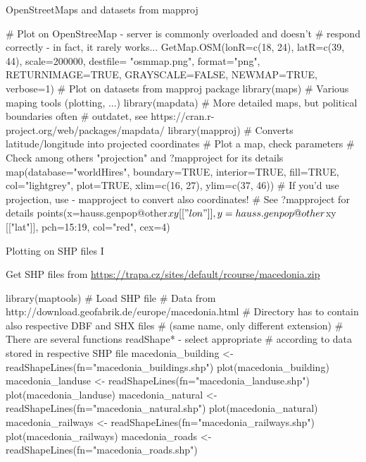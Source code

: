 \documentclass[compress, ucs, xelatex, 11pt, xcolor=svgnames,
  hyperref={
    bookmarks=true,
    unicode=true,
    colorlinks=true,
    pdftitle={Molecular data in R},
    plainpages=false,
    pdfauthor={Vojtech Zeisek},
    pdfsubject={Course about phylogeny and evolution in R},
    pdfcreator={XeLaTeX},
    pdfkeywords={R, evolution, phylogeny, molecular data},
    linkcolor=Tomato,
    anchorcolor=SaddleBrown,
    citecolor=Goldenrod,
    filecolor=DarkMagenta,
    menucolor=Sienna,
    urlcolor=DarkTurquoise,
    pdftex},
  url={hyphens, lowtilde} %
  ]{beamer}
\begin{document}
\begin{frame}[fragile]{OpenStreetMaps and datasets from mapproj}
  \begin{spluscode}
    # Plot on OpenStreeMap - server is commonly overloaded and doesn't
    # respond correctly - in fact, it rarely works...
    GetMap.OSM(lonR=c(18, 24), latR=c(39, 44), scale=200000, destfile=
      "osmmap.png", format="png", RETURNIMAGE=TRUE, GRAYSCALE=FALSE,
      NEWMAP=TRUE, verbose=1)
    # Plot on datasets from mapproj package
    library(maps) # Various maping tools (plotting, ...)
    library(mapdata) # More detailed maps, but political boundaries often
          # outdatet, see https://cran.r-project.org/web/packages/mapdata/
    library(mapproj) # Converts latitude/longitude into projected coordinates
    # Plot a map, check parameters
    # Check among others "projection" and ?mapproject for its details
    map(database="worldHires", boundary=TRUE, interior=TRUE, fill=TRUE,
      col="lightgrey", plot=TRUE, xlim=c(16, 27), ylim=c(37, 46))
    # If you'd use projection, use - mapproject to convert also coordinates!
    # See ?mapproject for details
    points(x=hauss.genpop@other$xy[["lon"]], y=hauss.genpop@other$xy
      [["lat"]], pch=15:19, col="red", cex=4)
  \end{spluscode}
\end{frame}

\begin{frame}[fragile]{Plotting on SHP files I}
\begin{scriptsize}
  Get SHP files from \url{https://trapa.cz/sites/default/rcourse/macedonia.zip}
\end{scriptsize}
  \begin{spluscode}
    library(maptools)
    # Load SHP file
    # Data from http://download.geofabrik.de/europe/macedonia.html
    # Directory has to contain also respective DBF and SHX files
    # (same name, only different extension)
    # There are several functions readShape* - select appropriate
    # according to data stored in respective SHP file
    macedonia_building <- readShapeLines(fn="macedonia_buildings.shp")
    plot(macedonia_building)
    macedonia_landuse <- readShapeLines(fn="macedonia_landuse.shp")
    plot(macedonia_landuse)
    macedonia_natural <- readShapeLines(fn="macedonia_natural.shp")
    plot(macedonia_natural)
    macedonia_railways <- readShapeLines(fn="macedonia_railways.shp")
    plot(macedonia_railways)
    macedonia_roads <- readShapeLines(fn="macedonia_roads.shp")
  \end{spluscode}
\end{frame}
\end{document}
